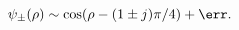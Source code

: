 \begin{equation} \label{solution-asymptotics}
\psi_\pm(\rho) \sim \cos(\rho - (1 \pm j)\pi / 4) + \err.
\end{equation}

